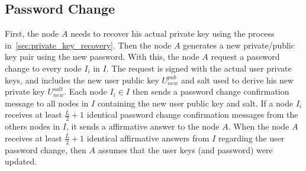\subsection{Password Change}

First, the node $A$ needs to recover his actual private key using the process
in~\ref{sec:private_key_recovery}. Then the node $A$ generates a new private/public
key pair using the new password.  With this, the node $A$ request a
password change to every node $I_i$ in $I$. The request is signed with the
actual user private keys, and includes the new user public key $U^{pub}_{new}$
and salt used to derive his new private key $U^{salt}_{new}$. 
Each node $I_i \in I$ then sends a password change confirmation message to all nodes
in $I$ containing the new user public key and salt. If a node $I_i$ receives at
least $\frac{L}{2} + 1$ identical password change confirmation messages from
the others nodes in $I$, it sends a affirmative answer to the node $A$.
 When the node $A$ receives at least $\frac{L}{2} + 1$ identical affirmative
answers from $I$ regarding the user password change, then $A$ assumes that the
user keys (and password) were updated.

